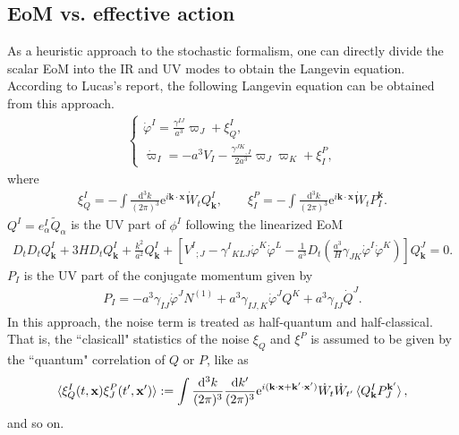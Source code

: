 \documentclass[aps, prd
, preprint
, nofootinbib 
]{revtex4-1}
\newcommand{\dd}{\mathrm{d}}
\newcommand{\ee}{\mathrm{e}}
\newcommand{\dk}{\frac{\dd^3k}{(2\pi)^3}}
\newcommand{\bae}[1]{\begin{align} #1 \end{align}}
\newcommand{\bce}[1]{\begin{cases} #1 \end{cases}}
\begin{document}
\subsection{EoM vs. effective action}

As a heuristic approach to the stochastic formalism, one can directly divide the scalar EoM into the IR and UV modes
to obtain the Langevin equation. According to Lucas's report, the following Langevin equation can be obtained from this approach.
\bae{\label{eq: heuristic}
	\bce{
		\displaystyle
		\dot{\varphi}^I=\frac{\gamma^{IJ}}{a^3}\varpi_J+\xi^I_Q, \\[10pt]
		\displaystyle
		\dot{\varpi}_I=-a^3V_I-\frac{\gamma^{JK}{}_{,I}}{2a^3}\varpi_J\varpi_K+\xi^P_I,
	}
}
where
\bae{
	\xi^I_Q=-\int\dk\ee^{i\mathbf{k}\cdot\mathbf{x}}\dot{W}_tQ^I_\mathbf{k}, \quad\quad
	\xi^P_I=-\int\dk\ee^{i\mathbf{k}\cdot\mathbf{x}}\dot{W}_tP_I^\mathbf{k}.
}
$Q^I=e^I_\alpha\tilde{Q}_\alpha$ is the UV part of $\phi^I$ following the linearized EoM
\bae{
	D_tD_tQ^I_\mathbf{k}+3HD_tQ^I_\mathbf{k}+\frac{k^2}{a^2}Q^I_\mathbf{k}
	+\left[V^I{}_{;J}-\gamma^I{}_{KLJ}\dot{\varphi}^K\dot{\varphi}^L
	-\frac{1}{a^3}D_t\left(\frac{a^3}{H}\gamma_{JK}\dot{\varphi}^I\dot{\varphi}^K\right)\right]Q^J_\mathbf{k}=0.
}
$P_I$ is the UV part of the conjugate momentum given by
\bae{\label{eq: def of P}
	P_I=-a^3\gamma_{IJ}\dot{\varphi}^JN^{(1)}+a^3\gamma_{IJ,K}\dot{\varphi}^JQ^K+a^3\gamma_{IJ}\dot{Q}^J.
}
In this approach, the noise term is treated as half-quantum and half-classical. That is, the ``clasicall" statistics of the noise $\xi_Q$ and $\xi^P$
is assumed to be given by the ``quantum" correlation of $Q$ or $P$, like as
\bae{
	\braket{\xi^I_Q(t,\mathbf{x})\xi^P_J(t^\prime,\mathbf{x}^\prime)}:=\int\dk\frac{\dd k^\prime}{(2\pi)^3}\ee^{i(\mathbf{k}\cdot{\mathbf{x}}
	+\mathbf{k}^\prime\cdot\mathbf{x}^\prime)}\dot{W}_t\dot{W}_{t^\prime}\braket{Q^I_\mathbf{k}P_J^{\mathbf{k}^\prime}},
}
and so on.
\end{document}
